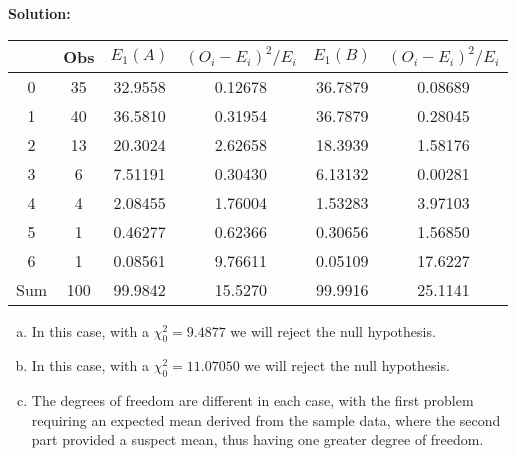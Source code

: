 \documentclass[12pt]{amsart}
\begin{document}
	\clearpage
	
	\textbf{Solution:} \\

	\begin{center}
	\begin{tabular}{cccccc}
		\toprule
	 & Obs & \(E_1(A)\) & \((O_i-E_i)^2/E_i\) & \(E_1(B)\) & \((O_i-E_i)^2/E_i\) \\
	    \midrule
	 0  &  35 &  32.9558  &  0.12678  &  36.7879  &  0.08689 \\
	 1  &  40 &  36.5810  &  0.31954  &  36.7879  &  0.28045 \\
	 2  &  13 &  20.3024  &  2.62658  &  18.3939  &  1.58176 \\
	 3  &  6  &  7.51191  &  0.30430  &  6.13132  &  0.00281 \\
	 4  &  4  &  2.08455  &  1.76004  &  1.53283  &  3.97103 \\
	 5  &  1  &  0.46277  &  0.62366  &  0.30656  &  1.56850 \\
	 6  &  1  &  0.08561  &  9.76611  &  0.05109  &  17.6227 \\
	 \midrule
	Sum & 100 &  99.9842  &  15.5270  &  99.9916  &  25.1141 \\
	\bottomrule
	\end{tabular} 
	\end{center} 
	\bigskip
	
	\begin{enumerate}[(a)]
		\item In this case, with a \(\chi^2_0=9.4877\) we will reject the null hypothesis.
		\item In this case, with a \(\chi^2_0=11.07050\) we will reject the null hypothesis.
		\item The degrees of freedom are different in each case, with the first problem 
		requiring an expected mean derived from the sample data, where the second part 
		provided a suspect mean, thus having one greater degree of freedom.
	\end{enumerate}
\end{document}
